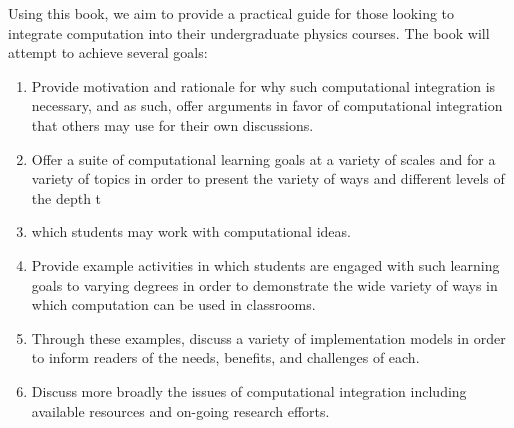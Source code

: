 \preface
Using this book, we aim to provide a practical guide for those looking to integrate computation into their undergraduate physics courses. The book will attempt to achieve several goals:
\begin{enumerate}
\item Provide motivation and rationale for why such computational integration is necessary, and as such, offer arguments in favor of computational integration that others may use for their own discussions.
\item Offer a suite of computational learning goals at a variety of scales and for a variety of topics in order to present the variety of ways and different levels of the depth t\item  which students may work with computational ideas.
\item Provide example activities in which students are engaged with such learning goals to varying degrees in order to demonstrate the wide variety of ways in which computation can be used in classrooms.
\item  Through these examples, discuss a variety of implementation models in order to inform readers of the needs, benefits, and challenges of each.
\item Discuss more broadly the issues of computational integration including available resources and on-going research efforts.
\end{enumerate}